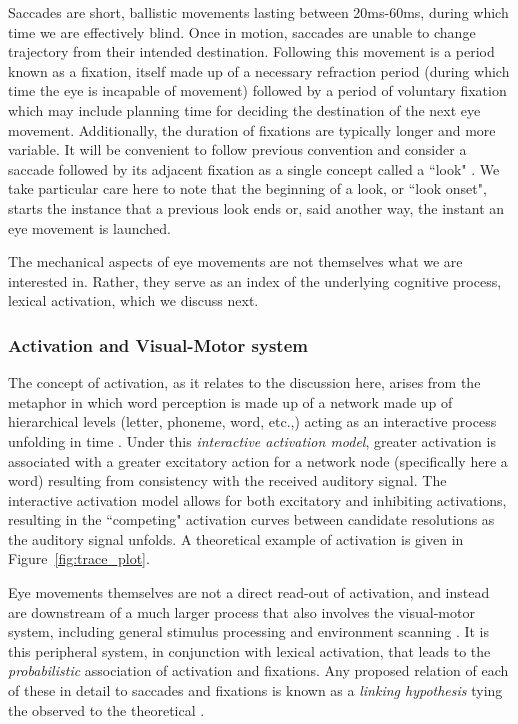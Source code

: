 \documentclass{article}
\begin{document}
Saccades are short, ballistic movements lasting between 20ms-60ms, during which time we are effectively blind. Once in motion, saccades are unable to change trajectory from their intended destination. Following this movement is a period known as a fixation, itself made up of a necessary refraction period (during which time the eye is incapable of movement) followed by a period of voluntary fixation which may include planning time for deciding the destination of the next eye movement. Additionally, the duration of fixations are typically longer and more variable. It will be convenient to follow previous convention and consider a saccade followed by its adjacent fixation as a single concept called a ``look" \citep{mcmurray2002look}. We take particular care here to note that the beginning of a look, or ``look onset", starts the instance that a previous look ends or, said another way, the instant an eye movement is launched. 

The mechanical aspects of eye movements are not themselves what we are interested in. Rather, they serve as an index of the underlying cognitive process, lexical activation, which we discuss next.

\subsubsection{Activation and Visual-Motor system}

The concept of activation, as it relates to the discussion here, arises from the metaphor in which word perception is made up of a network made up of hierarchical levels (letter, phoneme, word, etc.,) acting as an interactive process unfolding in time \citep{McClelland1981}. Under this \textit{interactive activation model}, greater activation is associated with a greater excitatory action for a network node (specifically here a word) resulting from consistency with the received auditory signal. The interactive activation model allows for both excitatory and inhibiting activations, resulting in the ``competing" activation curves between candidate resolutions as the auditory signal unfolds. A theoretical example of activation is given in Figure~\ref{fig:trace_plot}.

Eye movements themselves are not a direct read-out of activation, and instead are downstream of a much larger process that also involves the visual-motor system, including general stimulus processing and environment scanning \citep{Salthouse1980}. It is this peripheral system, in conjunction with lexical activation, that leads to the \textit{probabilistic} association of activation and fixations. Any proposed relation of each of these in detail to saccades and fixations is known as a \textit{linking hypothesis} tying the observed to the theoretical \citep{Magnuson2019}. 
\end{document}
